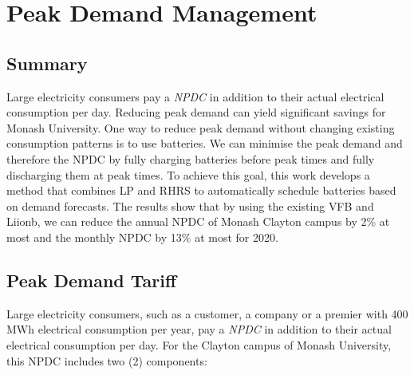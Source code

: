 \chapter{Peak Demand Management}
\label{chp:pdm}

\glsresetall


\section{Summary}

Large electricity consumers pay a \textit{\acrlong{NPDC}} in addition to their actual electrical consumption per day. Reducing peak demand can yield significant savings for Monash University. 
One way to reduce peak demand without changing existing consumption patterns is to use batteries. We can minimise the peak demand and therefore the \acrlong{NPDC} by fully charging batteries before peak times and fully discharging them at peak times. To achieve this goal, this work develops a method that combines \acrlong{LP} and \acrlong{RHRS} to automatically schedule batteries based on demand forecasts. The results show that by using the existing \acrlong{VFB} and \acrlong{Liionb}, we can reduce the annual \acrlong{NPDC} of Monash Clayton campus by 2\% at most and the monthly \acrlong{NPDC} by 13\% at most for 2020. 
 
\section{Peak Demand Tariff}
\label{pdm:tariff}

Large electricity consumers, such as a customer, a company or a premier with 400 MWh electrical consumption per year, pay a \textit{\gls{NPDC}} in addition to their actual electrical consumption per day. For the Clayton campus of Monash University, this \gls{NPDC} includes two (2) components: \\

